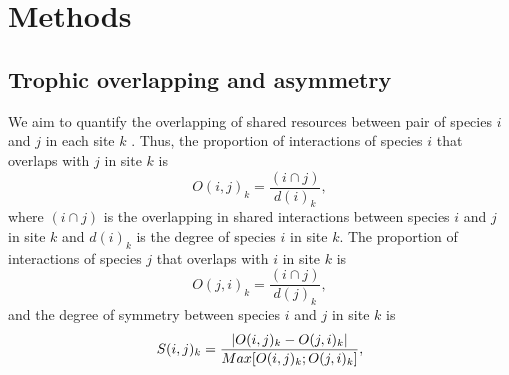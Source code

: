 \documentclass[12pt]{article}
\date
\DeclarePairedDelimiter\abs{\lvert}{\rvert}%
\begin{document}
\thispagestyle{empty}
\begin{flushleft}
  \vspace{0.25 in} {\Large }
\\
 \vspace{0.25 in} 
\\

\end{flushleft}

\vspace{0.3 in}

\section*{Methods}

\subsection*{Trophic overlapping and asymmetry}

We aim to quantify the overlapping of shared resources between pair of
species $i$ and $j$ in each site $k$ \citep{Araujoetal:2011}. Thus, the proportion of
interactions of species $i$ that overlaps with $j$ in site $k$ is
\begin{equation}
  O(i,j)_{k} = \frac{(i \cap j)}{d(i)_{k}},
\label{dispfreq}
\end{equation}
where $(i \cap j)$ is the overlapping in shared interactions between
species $i$ and $j$ in site $k$ and $d(i)_{k}$ is the degree of
species $i$ in site $k$. The proportion of interactions of species $j$
that overlaps with $i$ in site $k$ is
\begin{equation}
  O(j,i)_{k} = \frac{(i \cap j)}{d(j)_{k}},
\label{dispfreq}
\end{equation}
and the degree of symmetry between species $i$ and $j$ in site $k$ is 
\begin{equation}
  S(i,j)_{k} = \frac{\abs{O(i,j)_{k} - O(j,i)_{k}}}{Max[O(i,j)_{k};O(j,i)_{k}]},
\label{dispfreq}
\end{equation}


\newpage



\end{document}

